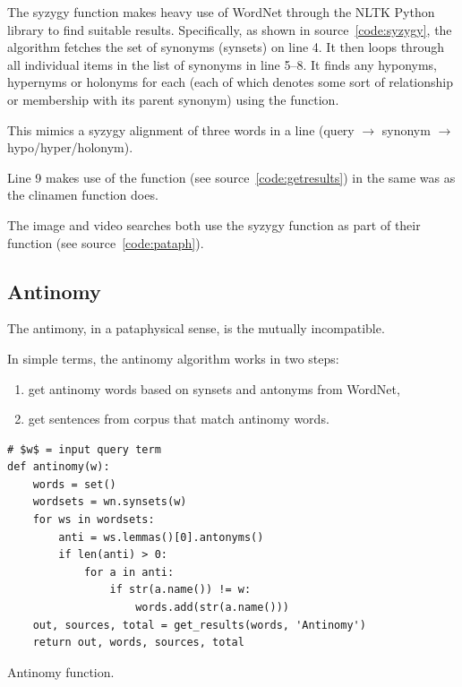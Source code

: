 The syzygy function makes heavy use of WordNet \parencite{Miller1995} through the \ac{NLTK} Python library to find suitable results. Specifically, as shown in source~\ref{code:syzygy}, the algorithm fetches the set of synonyms (synsets) on line 4. It then loops through all individual items  in the list of synonyms  in line 5--8. It finds any hyponyms, hypernyms or holonyms for each  (each of which denotes some sort of relationship or membership with its parent synonym) using the  function.

This mimics a syzygy alignment of three words in a line (query $\to$ synonym $\to$ hypo/hyper/holonym).

Line \num{9} makes use of the  function (see source~\ref{code:getresults}) in the same was as the clinamen function does.


The image and video searches both use the syzygy function as part of their  function (see source~\ref{code:pataph}).


\subsection{Antinomy}

The antimony, in a pataphysical sense, is the mutually incompatible.

In simple terms, the antinomy algorithm works in two steps:
\begin{enumerate}
  \item get antinomy words based on synsets and antonyms from WordNet,
  \item get sentences from corpus that match antinomy words.
\end{enumerate}

\begin{listing}
  \begin{verbatim}
# $w$ = input query term
def antinomy(w):
    words = set()
    wordsets = wn.synsets(w)
    for ws in wordsets:
        anti = ws.lemmas()[0].antonyms()
        if len(anti) > 0:
            for a in anti:
                if str(a.name()) != w:
                    words.add(str(a.name()))
    out, sources, total = get_results(words, 'Antinomy')
    return out, words, sources, total
  \end{verbatim}
\caption{Antinomy function.}
\label{code:antinomy}
\end{listing}

